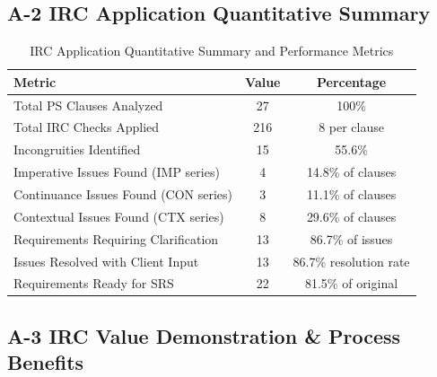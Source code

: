 \documentclass[11pt,a4paper]{article}
\begin{document}
\newpage
\subsection*{A-2 IRC Application Quantitative Summary}

\begin{table}[H]
\centering
\small
\renewcommand{\arraystretch}{1.2}
\begin{tabular}{|>{\raggedright\arraybackslash}p{}|c|c|}
\hline
\rowcolor{tableheader}
\textbf{Metric} & \textbf{Value} & \textbf{Percentage} \\
\hline
Total PS Clauses Analyzed & 27 & 100\% \\
\hline
Total IRC Checks Applied & 216 & 8 per clause \\
\hline
Incongruities Identified & 15 & 55.6\% \\
\hline
Imperative Issues Found (IMP series) & 4 & 14.8\% of clauses \\
\hline
Continuance Issues Found (CON series) & 3 & 11.1\% of clauses \\
\hline
Contextual Issues Found (CTX series) & 8 & 29.6\% of clauses \\
\hline
Requirements Requiring Clarification & 13 & 86.7\% of issues \\
\hline
Issues Resolved with Client Input & 13 & 86.7\% resolution rate \\
\hline
Requirements Ready for SRS & 22 & 81.5\% of original \\
\hline
\end{tabular}
\caption{IRC Application Quantitative Summary and Performance Metrics}
\label{tab:irc-summary}
\end{table}

\subsection*{A-3 IRC Value Demonstration \& Process Benefits}
\end{document}
